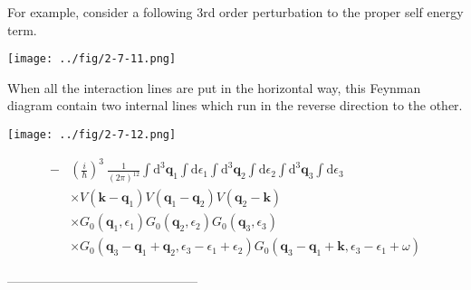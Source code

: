 For example, consider a following 3rd order perturbation to the proper self energy term.
\begin{center}
\label{Fig2.7.11} \texttt{[image: ../fig/2-7-11.png]}
\end{center}

When all the interaction lines are put in the horizontal way, this Feynman diagram contain two internal lines which run in the reverse direction to the other.
\begin{center}
\label{Fig2.7.12} \texttt{[image: ../fig/2-7-12.png]}
\end{center}

\[ \begin{split}
-&\left(\frac{i}{\hbar}\right)^3 \ \frac{1}{(2\pi)^{12}} \int \mathrm{d}^3 \mathbf{q}_1 \int \mathrm{d} \epsilon_1 \int \mathrm{d}^3 \mathbf{q}_2 \int \mathrm{d} \epsilon_2 \int \mathrm{d}^3 \mathbf{q}_3 \int \mathrm{d} \epsilon_3 \\
&\times V(\mathbf{k}-\mathbf{q}_1)V(\mathbf{q}_1-\mathbf{q}_2)V(\mathbf{q}_2-\mathbf{k})\\
&\times G_0(\mathbf{q}_1,\epsilon_1)G_0(\mathbf{q}_2,\epsilon_2)G_0(\mathbf{q}_3,\epsilon_3)\\
&\times G_0(\mathbf{q}_3-\mathbf{q}_1+\mathbf{q}_2,\epsilon_3-\epsilon_1+\epsilon_2)G_0(\mathbf{q}_3-\mathbf{q}_1+\mathbf{k},\epsilon_3-\epsilon_1+\omega)
\end{split} \]
\begin{center}---------------------------------------------\end{center}
